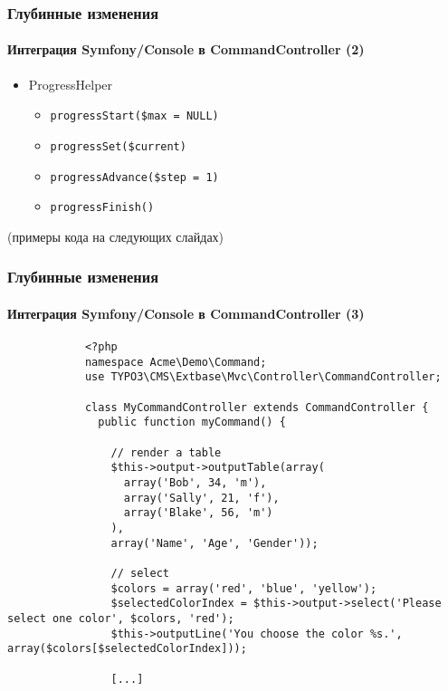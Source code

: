 \begin{frame}[fragile]
	\frametitle{Глубинные изменения}
	\framesubtitle{Интеграция Symfony/Console в CommandController (2)}

	\lstset{basicstyle=\tiny\ttfamily}

	\begin{itemize}
		\item \smaller ProgressHelper
			\begin{itemize}
				\item \smaller\texttt{progressStart(\$max = NULL)}
				\item \texttt{progressSet(\$current)}
				\item \texttt{progressAdvance(\$step = 1)}
				\item \texttt{progressFinish()}
			\end{itemize}
	\end{itemize}

	\smaller
		(примеры кода на следующих слайдах)
	\normalsize

\end{frame}


\begin{frame}[fragile]
	\frametitle{Глубинные изменения}
	\framesubtitle{Интеграция Symfony/Console в CommandController (3)}

	\lstset{basicstyle=\tiny\ttfamily}

		\begin{lstlisting}
			<?php
			namespace Acme\Demo\Command;
			use TYPO3\CMS\Extbase\Mvc\Controller\CommandController;

			class MyCommandController extends CommandController {
			  public function myCommand() {

			    // render a table
			    $this->output->outputTable(array(
			      array('Bob', 34, 'm'),
			      array('Sally', 21, 'f'),
			      array('Blake', 56, 'm')
			    ),
			    array('Name', 'Age', 'Gender'));

			    // select
			    $colors = array('red', 'blue', 'yellow');
			    $selectedColorIndex = $this->output->select('Please select one color', $colors, 'red');
			    $this->outputLine('You choose the color %s.', array($colors[$selectedColorIndex]));

			    [...]
		\end{lstlisting}

\end{frame}

